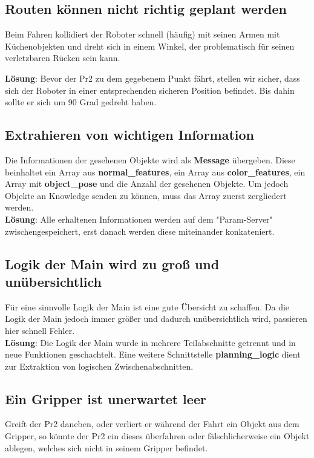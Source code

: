 \documentclass{suturo}
\begin{document}
\subsection{Routen können nicht richtig geplant werden}
Beim Fahren kollidiert der Roboter schnell (häufig) mit seinen Armen mit Küchenobjekten und dreht sich in einem Winkel, der problematisch für seinen verletzbaren Rücken sein kann.

\textbf{Lösung}: Bevor der Pr2 zu dem gegebenem Punkt fährt, stellen wir sicher, dass sich der Roboter in einer entsprechenden sicheren Position befindet. Bis dahin sollte er sich um 90 Grad gedreht haben.

\subsection{Extrahieren von wichtigen Information}

Die Informationen der gesehenen Objekte wird als \textbf{Message} übergeben. Diese beinhaltet ein Array aus \textbf{normal\_features}, ein Array aus \textbf{color\_features}, ein Array mit \textbf{object\_pose} und die Anzahl der gesehenen Objekte. 
Um jedoch Objekte an Knowledge senden zu können, muss das Array zuerst zergliedert werden. \\

\textbf{Lösung}: Alle erhaltenen Informationen werden auf dem "Param-Server" zwischengespeichert, erst danach werden diese miteinander konkateniert.

\subsection{Logik der Main wird zu groß und unübersichtlich}
Für eine sinnvolle Logik der Main ist eine gute Übersicht zu schaffen. Da die Logik der Main jedoch immer größer und dadurch unübersichtlich wird, passieren hier schnell Fehler.\\

\textbf{Lösung}: Die Logik der Main wurde in mehrere Teilabschnitte getrennt und in neue Funktionen geschachtelt. Eine weitere Schnittstelle \textbf{planning\_logic} dient zur Extraktion von logischen Zwischenabschnitten.


\subsection{Ein Gripper ist unerwartet leer}
Greift der Pr2 daneben, oder verliert er während der Fahrt ein Objekt aus dem Gripper, so könnte der Pr2 ein dieses überfahren oder fälschlicherweise ein Objekt ablegen, welches sich nicht in seinem Gripper befindet.\\
\end{document}
